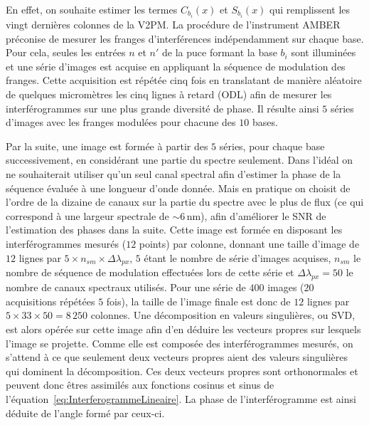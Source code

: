 En effet, on souhaite estimer les termes $C_{b_i}(x)$ et $S_{b_i}(x)$ qui remplissent les vingt dernières colonnes de la \ac{V2PM}. La procédure de l'instrument \ac{AMBER} préconise de mesurer les franges d'interférences indépendamment sur chaque base. Pour cela, seules les entrées $n$ et $n'$ de la puce formant la base $b_i$ sont illuminées et une série d'images est acquise en appliquant la séquence de modulation des franges. Cette acquisition est répétée cinq fois en translatant de manière aléatoire de quelques micromètres les cinq lignes à retard (\acrfull{ODL}) afin de mesurer les interférogrammes sur une plus grande diversité de phase. Il résulte ainsi $5$ séries d'images avec les franges modulées pour chacune des $10$ bases. 

Par la suite, une image est formée à partir des $5$ séries, pour chaque base successivement, en considérant une partie du spectre seulement. Dans l'idéal on ne souhaiterait utiliser qu'un seul canal spectral afin d'estimer la phase de la séquence évaluée à une longueur d'onde donnée. Mais en pratique on choisit de l'ordre de la dizaine de canaux sur la partie du spectre avec le plus de flux (ce qui correspond à une largeur spectrale de $\sim 6\,$nm), afin d'améliorer le \ac{SNR} de l'estimation des phases dans la suite. Cette image est formée en disposant les interférogrammes mesurés ($12$ points) par colonne, donnant une taille d'image de $12$ lignes par $5 \times n_{sm} \times \Delta\lambda_{px}$, $5$ étant le nombre de série d'images acquises, $n_{sm}$ le nombre de séquence de modulation effectuées lors de cette série et $\Delta\lambda_{px} = 50$ le nombre de canaux spectraux utilisés. Pour une série de $400$ images ($20$ acquisitions répétées $5$ fois), la taille de l'image finale est donc de $12$ lignes par $5 \times 33 \times 50 = 8\,250$ colonnes. Une décomposition en valeurs singulières, ou \ac{SVD}, est alors opérée sur cette image afin d'en déduire les vecteurs propres sur lesquels l'image se projette. Comme elle est composée des interférogrammes mesurés, on s'attend à ce que seulement deux vecteurs propres aient des valeurs singulières qui dominent la décomposition. Ces deux vecteurs propres sont orthonormales et peuvent donc êtres assimilés aux fonctions cosinus et sinus de l'équation~\ref{eq:InterferogrammeLineaire}. La phase de l'interférogramme est ainsi déduite de l'angle formé par ceux-ci.

